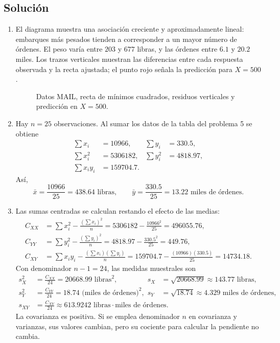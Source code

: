 \subsection*{Solución}

\begin{enumerate}
    \item[\textbf{a)}] El diagrama muestra una asociación creciente y aproximadamente lineal: embarques más pesados tienden a corresponder a un mayor número de órdenes. El peso varía entre $203$ y $677$ libras, y las órdenes entre $6.1$ y $20.2$ miles. Los trazos verticales muestran las diferencias entre cada respuesta observada y la recta ajustada; el punto rojo señala la predicción para $X=500$.
    \begin{figure}[H]
    \centering
    
    \caption{Datos MAIL, recta de mínimos cuadrados, residuos verticales y predicción en $X=500$.}
    \label{fig:clase4-mail-integrador-dispersion}
    \end{figure}

    \item[\textbf{b)}] Hay $n=25$ observaciones. Al sumar los datos de la tabla del problema 5 se obtiene
    \begin{align*}
    \sum x_i&=10966,& \sum y_i&=330.5,\\
    \sum x_i^2&=5306182,& \sum y_i^2&=4818.97,\\
    \sum x_iy_i&=159704.7.
    \end{align*}
    Así,
    \[
    \bar x=\frac{10966}{25}=438.64\text{ libras},\qquad
    \bar y=\frac{330.5}{25}=13.22\text{ miles de órdenes}.
    \]

    \item[\textbf{c)}] Las sumas centradas se calculan restando el efecto de las medias:
    \begin{align*}
    C_{XX}&=\sum x_i^2-\frac{(\sum x_i)^2}{n}
    =5306182-\frac{10966^2}{25}=496055.76,\\
    C_{YY}&=\sum y_i^2-\frac{(\sum y_i)^2}{n}
    =4818.97-\frac{330.5^2}{25}=449.76,\\
    C_{XY}&=\sum x_iy_i-\frac{(\sum x_i)(\sum y_i)}{n}
    =159704.7-\frac{(10966)(330.5)}{25}=14734.18.
    \end{align*}
    Con denominador $n-1=24$, las medidas muestrales son
    \begin{align*}
    s_X^2&=\frac{C_{XX}}{24}=20668.99\text{ libras}^2,&
    s_X&=\sqrt{20668.99}\approx143.77\text{ libras},\\
    s_Y^2&=\frac{C_{YY}}{24}=18.74\text{ (miles de órdenes)}^2,&
    s_Y&=\sqrt{18.74}\approx4.329\text{ miles de órdenes},\\
    s_{XY}&=\frac{C_{XY}}{24}\approx613.9242\text{ libras}\cdot\text{miles de órdenes}.
    \end{align*}
    La covarianza es positiva. Si se emplea denominador $n$ en covarianza y varianzas, sus valores cambian, pero su cociente para calcular la pendiente no cambia.


\end{enumerate}
